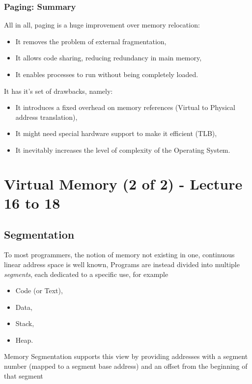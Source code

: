 \documentclass[openright, twoside]{report}
\theoremstyle{definition}
\theoremstyle{example}
\begin{document}
\subsection{Paging: Summary}
All in all, paging is a huge improvement over memory relocation:
\begin{itemize}
	\item It removes the problem of external fragmentation,
	\item It allows code sharing, reducing redundancy in main memory,
	\item It enables processes to run without being completely loaded.
\end{itemize}

It has it's set of drawbacks, namely:

\begin{itemize}
	\item It introduces a fixed overhead on memory references (Virtual to Physical address translation),
	\item It might need special hardware support to make it efficient (TLB),
	\item It inevitably increases the level of complexity of the Operating System.
\end{itemize}






\chapter{Virtual Memory (2 of 2) - Lecture 16 to 18}

\section{Segmentation}
To most programmers, the notion of memory not existing 
in one, continuous linear address space is well known, Programs
are instead divided into multiple \emph{segments}, each dedicated 
to a specific use, for example
\begin{itemize}
	\item Code (or Text),
	\item Data,
	\item Stack,
	\item Heap.
\end{itemize}

Memory Segmentation supports this view by providing addresses with 
a segment number (mapped to a segment base address) and an 
offset from the beginning of that segment
\end{document}

